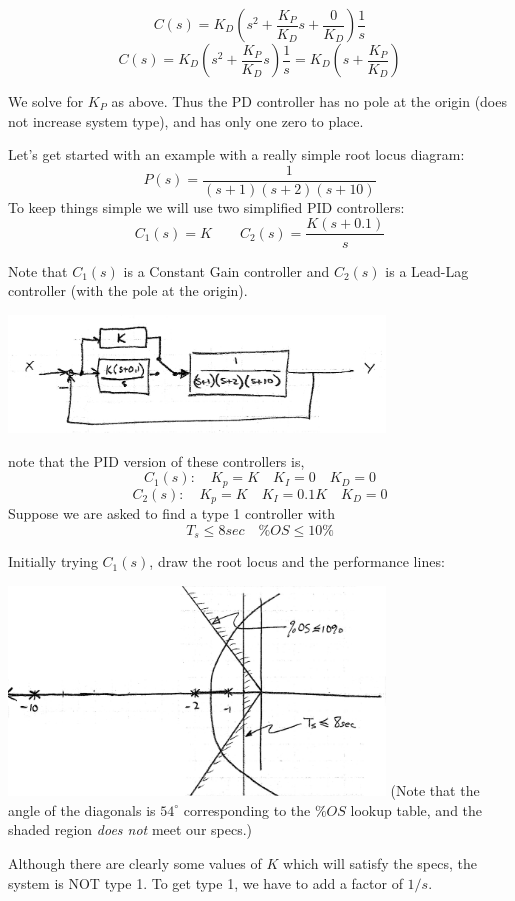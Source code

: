 \[
C(s) = K_D \left ( s^2+ \frac{K_P}{K_D}s + \frac{0}{K_D} \right ) \frac{1}{s}
\]
 \[
 C(s) = K_D \left ( s^2+ \frac{K_P}{K_D}s \right ) \frac{1}{s} = K_D\left ( s+\frac {K_P}  {K_D} \right )
 \]

We solve for $K_P$ as above.
Thus the PD controller has no pole at the origin (does not increase
 system type), and has only one zero to place.


\begin{Example}
Let's get started with an example with a really simple root locus diagram:
\[
P(s) = \frac  {1}   {(s+1)(s+2)(s+10)}
\]
To keep things simple we will use two simplified PID controllers:
\[
C_1(s) = K \qquad   C_2(s) = \frac   {K(s+0.1)} {s}
\]

Note that $C_1(s)$ is a Constant Gain controller and $C_2(s)$ is
a Lead-Lag controller (with the pole at the origin).


\includegraphics[width=100mm]{figs09/01107.png}

note that the PID version of these controllers is,
\[
C_1(s):  \quad K_p = K \quad K_I = 0 \quad K_D = 0
\]
\[
C_2(s):  \quad K_p = K \quad K_I = 0.1K \quad K_D = 0
\]
Suppose we are asked  to find a type 1 controller with
\[
T_s \leq 8sec \quad \%OS \leq 10\%
\]

Initially trying $C_1(s)$, draw the root locus and the performance lines:

\includegraphics[width=100mm]{figs09/01108.png}
(Note that the angle of the diagonals is $54^\circ$ corresponding to the $\%OS$ lookup table, and the
shaded region {\it does not} meet our specs.)

Although   there are clearly some values of $K$ which will satisfy the specs, the system is NOT type 1.
To get type 1, we have to add a factor of $1/s$.
\end{Example}
